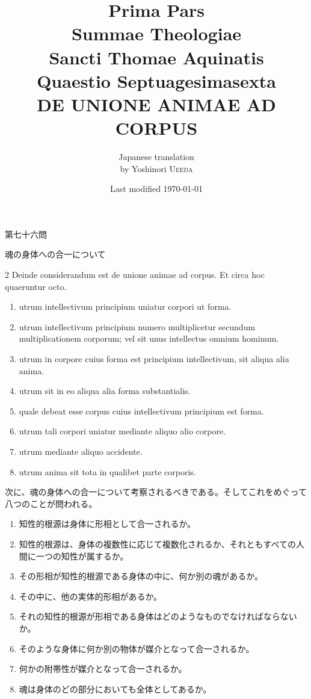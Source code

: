 \documentclass[paper=a4paper,fontsize=10pt,jafontsize=9pt,titlepage]{jlreq}
\title{{\bfseries Prima Pars}\\{\Huge Summae Theologiae}\\Sancti Thomae
Aquinatis\\{\sffamily Quaestio Septuagesimasexta}\\{\bfseries DE UNIONE ANIMAE AD CORPUS}}
\author{Japanese translation\\by Yoshinori {\scshape Ueeda}}
\date{Last modified \today}
\begin{document}
\maketitle
\tableofcontents
\newpage
\begin{center}
 {\Large 第七十六問}
\end{center}
\vspace{1em}
\begin{center}
{\Large 魂の身体への合一について}
\end{center}
\vspace{2em}

\begin{paracol}{2}
 Deinde considerandum est de unione animae ad corpus. Et circa hoc quaeruntur octo. 

 \begin{enumerate}
  \item utrum intellectivum principium uniatur corpori ut forma.
  \item utrum intellectivum principium numero multiplicetur secundum multiplicationem corporum; vel sit unus intellectus omnium hominum.
  \item utrum in corpore cuius forma est principium intellectivum, sit aliqua alia anima.
  \item utrum sit in eo aliqua alia forma substantialis.
  \item quale debeat esse corpus cuius intellectivum principium est forma.
  \item utrum tali corpori uniatur mediante aliquo alio corpore.
  \item utrum mediante aliquo accidente.
  \item utrum anima sit tota in qualibet parte corporis.
 \end{enumerate}

 \switchcolumn 

 次に、魂の身体への合一について考察されるべきである。そしてこれをめぐって八つのことが問われる。
 \begin{enumerate}
  \item 知性的根源は身体に形相として合一されるか。
  \item 知性的根源は、身体の複数性に応じて複数化されるか、それともすべての人間に一つの知性が属するか。
  \item その形相が知性的根源である身体の中に、何か別の魂があるか。
  \item その中に、他の実体的形相があるか。
  \item それの知性的根源が形相である身体はどのようなものでなければならないか。
  \item そのような身体に何か別の物体が媒介となって合一されるか。
  \item 何かの附帯性が媒介となって合一されるか。
  \item 魂は身体のどの部分においても全体としてあるか。
 \end{enumerate}

\end{paracol}
\newpage 
\end{document}
